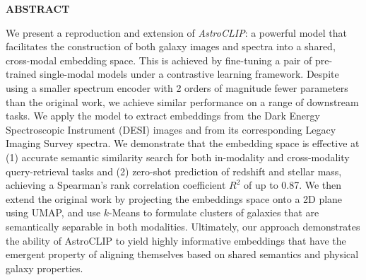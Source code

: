 \documentclass[a4paper,12pt]{article}
\begin{document}
    \newpage
    \begin{center}
        \textbf{ABSTRACT}
    \end{center}
    We present a reproduction and extension of \emph{AstroCLIP}: a powerful model that facilitates the construction of both galaxy images and spectra into a shared, cross-modal embedding space. This is achieved by fine-tuning a pair of pre-trained single-modal models under a contrastive learning framework. Despite using a smaller spectrum encoder with 2 orders of magnitude fewer parameters than the original work, we achieve similar performance on a range of downstream tasks. We apply the model to extract embeddings from the Dark Energy Spectroscopic Instrument (DESI) images and from its corresponding Legacy Imaging Survey spectra. We demonstrate that the embedding space is effective at (1) accurate semantic similarity search for both in-modality and cross-modality query-retrieval tasks and (2) zero-shot prediction of redshift and stellar mass, achieving a Spearman's rank correlation coefficient $R^2$ of up to 0.87. We then extend the original work by projecting the embeddings space onto a 2D plane using UMAP, and use $k$-Means to formulate clusters of galaxies that are semantically separable in both modalities. Ultimately, our approach demonstrates the ability of AstroCLIP to yield highly informative embeddings that have the emergent property of aligning themselves based on shared semantics and physical galaxy properties.



    \newpage
    
    \tableofcontents
    
    \newpage





\end{document}
